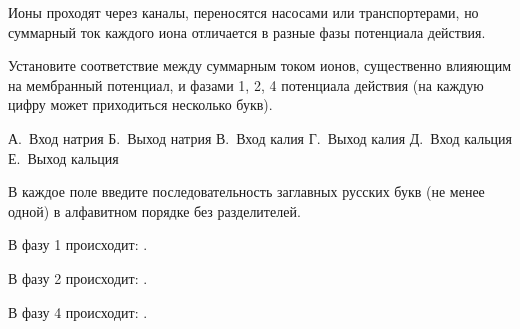 
Ионы проходят через каналы, переносятся насосами или транспортерами, но суммарный ток каждого иона отличается в разные фазы потенциала действия.

Установите соответствие между суммарным током ионов, существенно влияющим на мембранный потенциал, и фазами 1, 2, 4 потенциала действия (на каждую цифру может приходиться несколько букв).



А. Вход натрия
Б. Выход натрия
В. Вход калия
Г. Выход калия
Д. Вход кальция
Е. Выход кальция

В каждое поле введите последовательность заглавных русских букв (не менее одной) в алфавитном порядке без разделителей.

В фазу 1 происходит: \underline{\hspace{2in}}. 

В фазу 2 происходит: \underline{\hspace{2in}}. 

В фазу 4 происходит: \underline{\hspace{2in}}.